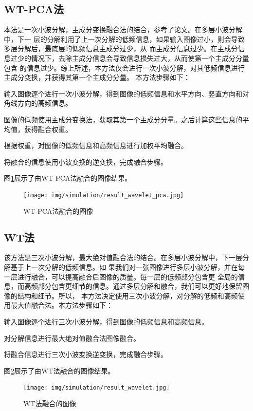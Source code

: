 \documentclass{xduugthesis}
\begin{document}
\subsection{WT-PCA法}
本法是一次小波分解，主成分变换融合法的结合，参考了论文\parencite{PCA_Merge}。在多层小波分解中，下一
层的分解利用了上一次分解的低频信息，如果输入图像过小，则会导致多层分解后，最底层的低频信息主成分过少，从
而主成分信息过少。在主成分信息过少的情况下，去除主成分信息会导致信息损失过大，从而使第一个主成分分量包含
的信息过少。综上所述，本方法仅会进行一次小波分解，对其低频信息进行主成分变换，并获得其第一个主成分分量。
本方法步骤如下：\\
\begin{enumerate*}[itemjoin=\\\hspace*{\parindent}, itemsep=5mm\hspace*{\parindent}]
	\item 输入图像逐个进行一次小波分解，得到图像的低频信息和水平方向、竖直方向和对角线方向的高频信息。
	\item 图像的低频使用主成分变换法，获取其第一个主成分分量。之后计算这些信息的平均值，获得融合权重。
	\item 根据权重，对图像的低频信息和高频信息进行加权平均融合。
	\item 将融合的信息使用小波变换的逆变换，完成融合步骤。
\end{enumerate*}\par
图\ref{simulation_wavelet_pca}展示了由WT-PCA法融合的图像结果。
\begin{figure}[!htb]
	\texttt{[image: img/simulation/result\_wavelet\_pca.jpg]}
	\caption{WT-PCA法融合的图像}\label{simulation_wavelet_pca}
\end{figure}
\subsection{WT法}
该方法是三次小波分解，最大绝对值融合法的结合。在多层小波分解中，下一层分解基于上一次分解的低频信息。如
果我们对一张图像进行多层小波分解，并在每一层进行融合，可以提高融合后图像的质量。每一层的低频部分包含更
全局的信息，而高频部分包含更细节的信息。通过多层分解和融合，我们可以更好地保留图像的结构和细节。所以，
本方法决定使用三次小波分解，对分解的低频和高频使用最大值融合法。本方法步骤如下：\\
\begin{enumerate*}[itemjoin=\\\hspace*{\parindent}, itemsep=5mm\hspace*{\parindent}]
	\item 输入图像逐个进行三次小波分解，得到图像的低频信息和高频信息。
	\item 对分解信息进行最大绝对值融合法图像融合。
	\item 将融合信息进行三次小波变换逆变换，完成融合步骤。
\end{enumerate*}\par
图\ref{simulation_wavelet}展示了由WT法融合的图像结果。
\begin{figure}[!htb]
	\texttt{[image: img/simulation/result\_wavelet.jpg]}
	\caption{WT法融合的图像}\label{simulation_wavelet}
\end{figure}
\end{document}
